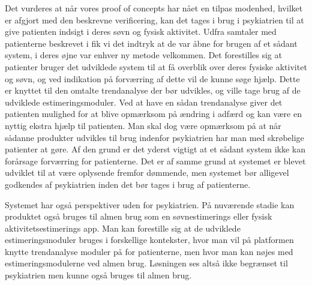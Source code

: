 Det vurderes at når vores proof of concepts har nået en tilpas modenhed, hvilket er afgjort med den beskrevne verificering, kan det tages i brug i psykiatrien til at give patienten indsigt i deres søvn og fysisk aktivitet. 
Udfra samtaler med patienterne beskrevet i \citet{misc:faellesrapp} fik vi det indtryk at de var åbne for brugen af et sådant system, i deres øjne var enhver ny metode velkommen.
Det forestilles sig at patienter bruger det udviklede system til at få overblik over deres fysiske aktivitet og søvn, og ved indikation på forværring af dette vil de kunne søge hjælp. 
Dette er knyttet til den omtalte trendanalyse der bør udvikles, og ville tage brug af de udviklede estimeringsmoduler.
Ved at have en sådan trendanalyse giver det patienten mulighed for at blive opmærksom på ændring i adfærd og kan være en nyttig ekstra hjælp til patienten.
Man skal dog være opmærksom på at når sådanne produkter udvikles til brug indenfor psykiatrien har man med skrøbelige patienter at gøre.
Af den grund er det yderst vigtigt at et sådant system ikke kan forårsage forværring for patienterne.
Det er af samme grund at systemet er blevet udviklet til at være oplysende fremfor dømmende, men systemet bør alligevel godkendes af psykiatrien inden det bør tages i brug af patienterne.

Systemet har også perspektiver uden for psykiatrien.
På nuværende stadie kan produktet også bruges til almen brug som en søvnestimerings eller fysisk aktivitetsestimerings app.
Man kan forestille sig at de udviklede estimeringsmoduler bruges i forskellige kontekster, hvor man vil på platformen knytte trendanalyse moduler på for patienterne, men hvor man kan nøjes med estimeringsmodulerne ved almen brug.
Løsningen ses altså ikke begrænset til psykiatrien men kunne også bruges til almen brug.

